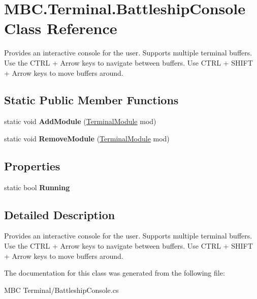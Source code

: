 \hypertarget{class_m_b_c_1_1_terminal_1_1_battleship_console}{\section{M\-B\-C.\-Terminal.\-Battleship\-Console Class Reference}
\label{class_m_b_c_1_1_terminal_1_1_battleship_console}
}


Provides an interactive console for the user. Supports multiple terminal buffers. Use the C\-T\-R\-L + Arrow keys to navigate between buffers. Use C\-T\-R\-L + S\-H\-I\-F\-T + Arrow keys to move buffers around. 


\subsection*{Static Public Member Functions}
\begin{DoxyCompactItemize}
\item 
\hypertarget{class_m_b_c_1_1_terminal_1_1_battleship_console_a89071191eaedff5ae79a50df8e96cc62}{static void {\bfseries Add\-Module} (\hyperlink{class_m_b_c_1_1_terminal_1_1_terminal_module}{Terminal\-Module} mod)}\label{class_m_b_c_1_1_terminal_1_1_battleship_console_a89071191eaedff5ae79a50df8e96cc62}

\item 
\hypertarget{class_m_b_c_1_1_terminal_1_1_battleship_console_addf07795ef0f5eb6ec3ed0f9ee474502}{static void {\bfseries Remove\-Module} (\hyperlink{class_m_b_c_1_1_terminal_1_1_terminal_module}{Terminal\-Module} mod)}\label{class_m_b_c_1_1_terminal_1_1_battleship_console_addf07795ef0f5eb6ec3ed0f9ee474502}

\end{DoxyCompactItemize}
\subsection*{Properties}
\begin{DoxyCompactItemize}
\item 
\hypertarget{class_m_b_c_1_1_terminal_1_1_battleship_console_a9d59eecb80eb0161c4d9ee373682a4f7}{static bool {\bfseries Running}}\label{class_m_b_c_1_1_terminal_1_1_battleship_console_a9d59eecb80eb0161c4d9ee373682a4f7}

\end{DoxyCompactItemize}


\subsection{Detailed Description}
Provides an interactive console for the user. Supports multiple terminal buffers. Use the C\-T\-R\-L + Arrow keys to navigate between buffers. Use C\-T\-R\-L + S\-H\-I\-F\-T + Arrow keys to move buffers around.

The documentation for this class was generated from the following file\-:\begin{DoxyCompactItemize}
\item 
M\-B\-C Terminal/Battleship\-Console.\-cs\end{DoxyCompactItemize}
